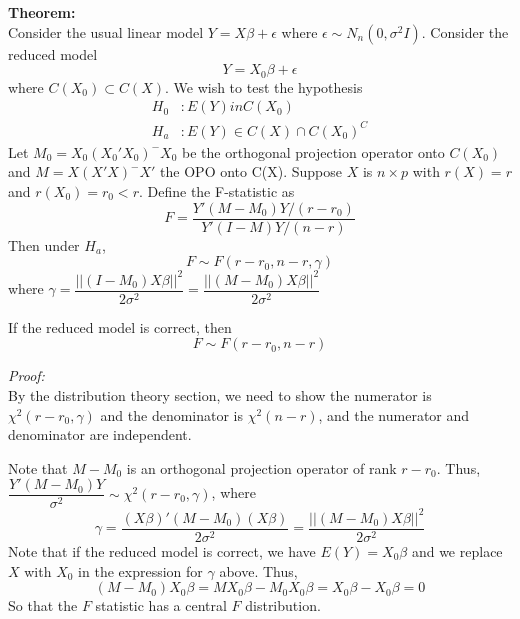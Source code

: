 \documentclass[12pt]{article}
\numberwithin{equation}{section}
\begin{document}
\textbf{Theorem:} \\
Consider the usual linear model $Y = X\beta + \epsilon$ where 
$\epsilon \sim N_n(0, \sigma^2 I)$. Consider the reduced model
\begin{equation*}
  Y = X_0 \beta + \epsilon
\end{equation*}
where $C(X_0) \subset C(X)$. We wish to test the hypothesis
\begin{align*}
  H_0 &: E(Y) in C(X_0) \\
  H_a &: E(Y) \in C(X) \cap C(X_0)^C
\end{align*}
Let $M_0 = X_0 (X_0' X_0)^{-} X_0$ be the orthogonal projection operator onto $C(X_0)$ and $M = X(X'X)^{-}X'$ the OPO onto C(X). Suppose $X$ is $n \times p$ with $r(X) = r$ and $r(X_0) = r_0 < r$. Define the F-statistic as
\begin{equation*}
  F = \frac{Y'(M - M_0)Y / (r - r_0)}{Y'(I - M)Y / (n - r)}
\end{equation*}
Then under $H_a$,
\begin{equation*}
  F \sim F(r - r_0, n - r, \gamma)
\end{equation*}
where $\gamma = \dfrac{||(I - M_0) X\beta||^2}{2\sigma^2}
 = \dfrac{||(M - M_0)X\beta||^2}{2\sigma^2}$

If the reduced model is correct, then
\begin{equation*}
  F \sim F(r - r_0, n - r)
\end{equation*}

\textit{Proof:} \\
By the distribution theory section, we need to show the numerator is $\chi^2(r - r_0, \gamma)$ and the denominator is $\chi^2(n - r)$, and the numerator and denominator are independent.

Note that $M - M_0$ is an orthogonal projection operator of rank $r - r_0$. Thus, $\dfrac{Y'(M - M_0)Y}{\sigma^2} \sim \chi^2(r - r_0, \gamma)$, where
%
\begin{equation*}
  \gamma = \frac{(X\beta)'(M - M_0)(X\beta)}{2\sigma^2} 
    = \frac{||(M - M_0)X\beta||^2}{2\sigma^2}
\end{equation*}
%
Note that if the reduced model is correct, we have $E(Y) = X_0\beta$ and we replace $X$ with $X_0$ in the expression for $\gamma$ above. Thus,
%
\begin{equation*}
  (M - M_0)X_0\beta = MX_0 \beta - M_0 X_0 \beta = X_0 \beta - X_0 \beta = 0
\end{equation*}
%
So that the $F$ statistic has a central $F$ distribution.
\end{document}

